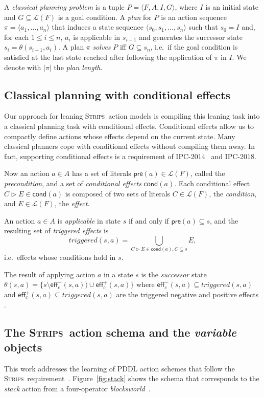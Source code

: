 \documentclass[letterpaper]{article} %
\newcommand{\tup}[1]{{\langle #1 \rangle}}
\newcommand{\pre}{\mathsf{pre}}     %
\newcommand{\eff}{\mathsf{eff}}     %
\newcommand{\cond}{\mathsf{cond}}   %
\newcommand{\strips}{\textsc{Strips}}     %
\begin{document}
A {\em classical planning problem} is a tuple $P=\tup{F,A,I,G}$, where $I$ is an initial state and $G\subseteq\mathcal{L}(F)$ is a goal condition. A {\em plan} for $P$ is an action sequence $\pi=\tup{a_1, \ldots, a_n}$ that induces a state sequence $\tup{s_0, s_1, \ldots, s_n}$ such that $s_0=I$ and, for each {\small $1\leq i\leq n$}, $a_i$ is applicable in $s_{i-1}$ and generates the successor state $s_i=\theta(s_{i-1},a_i)$. A plan $\pi$ {\em solves} $P$ iff $G\subseteq s_n$, i.e.~if the goal condition is satisfied at the last state reached after following the application of $\pi$ in $I$. We denote with $|\pi|$ the {\em plan length}.


\subsection{Classical planning with conditional effects}
Our approach for leaning \strips\ action models is compiling this leaning task into a classical planning task with conditional effects. Conditional effects allow us to compactly define actions whose effects depend on the current state. Many classical planners cope with conditional effects without compiling them away. In fact, supporting conditional effects is a requirement of IPC-2014~\cite{vallati:IPC:AIM2015} and IPC-2018.

Now an action $a\in A$ has a set of literals $\pre(a)\in\mathcal{L}(F)$, called the {\em precondition}, and a set of {\em conditional effects} $\cond(a)$. Each conditional effect $C\rhd E\in\cond(a)$ is composed of two sets of literals $C\in\mathcal{L}(F)$, the {\em condition}, and $E\in\mathcal{L}(F)$, the {\em effect}.

An action $a\in A$ is {\em applicable} in state $s$ if and only if $\pre(a)\subseteq s$, and the resulting set of {\em triggered effects} is
\[
triggered(s,a)=\bigcup_{C\rhd E\in\cond(a),C\subseteq s} E,
\]
i.e.~effects whose conditions hold in $s$.

The result of applying action $a$ in a state $s$ is the {\em successor} state $\theta(s,a)=\{s\setminus\eff_c^-(s,a))\cup\eff_c^+(s,a)\}$ where $\eff_c^-(s,a)\subseteq triggered(s,a)$ and $\eff_c^+(s,a)\subseteq triggered(s,a)$ are the triggered negative and positive effects .


\subsection{The \strips\ action schema and the {\em variable} objects}
This work addresses the learning of PDDL action schemes that follow the \strips\ requirement~\cite{mcdermott1998pddl,fox2003pddl2}. Figure~\ref{fig:stack} shows the schema that corresponds to the {\em stack} action from a four-operator {\em blocksworld}~\cite{slaney2001blocks}.
\end{document}
